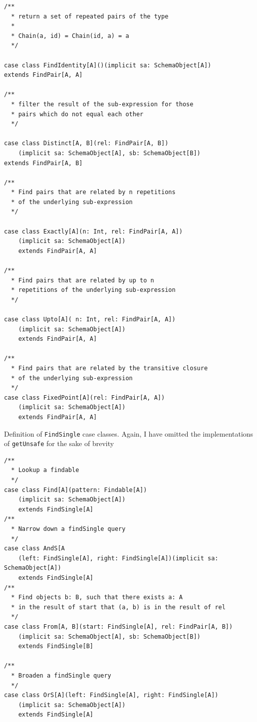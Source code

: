 \documentclass[12pt,a4paper,twoside,openright]{report}
\newcommand\codeName[1]{\texttt{#1}}
\renewcommand{\baselinestretch}{1.1}    %
\begin{document}
\begin{framed}
\begin{verbatim}
/**
  * return a set of repeated pairs of the type
  *
  * Chain(a, id) = Chain(id, a) = a
  */

case class FindIdentity[A]()(implicit sa: SchemaObject[A])
extends FindPair[A, A]

/**
  * filter the result of the sub-expression for those
  * pairs which do not equal each other
  */

case class Distinct[A, B](rel: FindPair[A, B])
    (implicit sa: SchemaObject[A], sb: SchemaObject[B])
extends FindPair[A, B]

/**
  * Find pairs that are related by n repetitions
  * of the underlying sub-expression
  */

case class Exactly[A](n: Int, rel: FindPair[A, A])
    (implicit sa: SchemaObject[A])
    extends FindPair[A, A]

/**
  * Find pairs that are related by up to n
  * repetitions of the underlying sub-expression
  */

case class Upto[A]( n: Int, rel: FindPair[A, A])
    (implicit sa: SchemaObject[A])
    extends FindPair[A, A]

/**
  * Find pairs that are related by the transitive closure
  * of the underlying sub-expression
  */
case class FixedPoint[A](rel: FindPair[A, A])
    (implicit sa: SchemaObject[A])
    extends FindPair[A, A]

\end{verbatim}
\end{framed}
\renewcommand{\baselinestretch}{1.1}

Definition of \codeName{FindSingle} case classes. Again, I have omitted the implementations of \codeName{getUnsafe} for the sake of brevity
\renewcommand{\baselinestretch}{0.8}
\begin{framed}
\begin{verbatim}
/**
  * Lookup a findable
  */
case class Find[A](pattern: Findable[A])
    (implicit sa: SchemaObject[A])
    extends FindSingle[A]
/**
  * Narrow down a findSingle query
  */
case class AndS[A
    (left: FindSingle[A], right: FindSingle[A])(implicit sa: SchemaObject[A])
    extends FindSingle[A]
/**
  * Find objects b: B, such that there exists a: A
  * in the result of start that (a, b) is in the result of rel
  */
case class From[A, B](start: FindSingle[A], rel: FindPair[A, B])
    (implicit sa: SchemaObject[A], sb: SchemaObject[B])
    extends FindSingle[B]

/**
  * Broaden a findSingle query
  */
case class OrS[A](left: FindSingle[A], right: FindSingle[A])
    (implicit sa: SchemaObject[A])
    extends FindSingle[A]
\end{verbatim}
\end{framed}
\renewcommand{\baselinestretch}{1.1}
\end{document}
